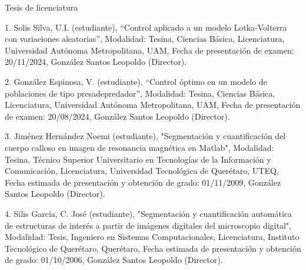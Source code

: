 Tesis de licenciatura

1. Solis Silva, U.I. (estudiante), “Control aplicado a un modelo Lotka-Volterra con variaciones 
aleatorias”, Modalidad: Tesina, Ciencias Básica, Licenciatura, Universidad Autónoma Metropolitana, 
UAM, Fecha de presentación de examen: 20/11/2024, González Santos Leopoldo (Director).

2. González Espinosa, V. (estudiante), “Control óptimo en un modelo de poblaciones de tipo 
presadepredador”, Modalidad: Tesina, Ciencias Básica, Licenciatura, Universidad Autónoma 
Metropolitana, UAM, Fecha de presentación de examen: 20/08/2024, González Santos Leopoldo 
(Director).

3. Jiménez Hernández Noemi (estudiante), "Segmentación y cuantificación del cuerpo calloso en imagen 
de resonancia magnética en Matlab", Modalidad: Tesina, Técnico Superior Universitario en Tecnologías 
de la Información y Comunicación, Licenciatura, Universidad Tecnológica de Querétaro, UTEQ, Fecha 
estimada de presentación y obtención de grado: 01/11/2009, González Santos Leopoldo (Director).

4. Silis García, C. José (estudiante), "Segmentación y cuantificación automática de estructuras de 
interés a partir de imágenes digitales del microscopio digital", Modalidad: Tesis, Ingeniero en 
Sistemas Computacionales, Licenciatura, Instituto Tecnológico de Querétaro, Querétaro, Fecha 
estimada de presentación y obtención de grado: 01/10/2006, González Santos Leopoldo (Director).


